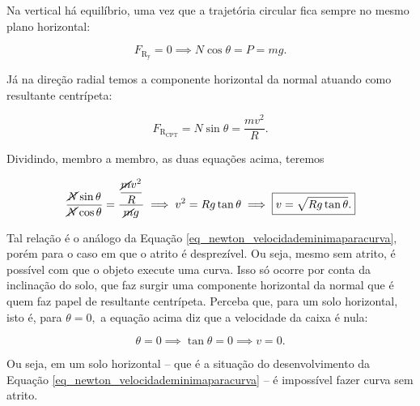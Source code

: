 \begin{exemplo}[Nível II]
Na vertical há equilíbrio, uma vez que a trajetória circular fica sempre no mesmo plano horizontal:

$$ F_{\text{R}_{\text{y}}} = 0 \implies N \cos \theta = P=mg.$$

Já na direção radial temos a componente horizontal da normal atuando como resultante centrípeta:

$$ F_{\text{R}_{\text{CPT}}} = N \sin \theta = \dfrac{mv^2}{R}.$$

Dividindo, membro a membro, as duas equações acima, teremos

$$ \dfrac{\cancel N \sin \theta}{\cancel N \cos \theta} = \dfrac{\dfrac{\cancel mv^2}{R}}{\cancel mg} \implies v^2 = Rg \tan \theta \implies \boxed{v=\sqrt{Rg \tan \theta}.}$$

Tal relação é o análogo da Equação \eqref{eq_newton_velocidademinimaparacurva}, porém para o caso em que o atrito é desprezível. Ou seja, mesmo sem atrito, é possível com que o objeto execute uma curva. Isso só ocorre por conta da inclinação do solo, que faz surgir uma componente horizontal da normal que é quem faz papel de resultante centrípeta. Perceba que, para um solo horizontal, isto é, para $\theta = 0,$ a equação acima diz que a velocidade da caixa é nula:

$$ \theta = 0 \implies \tan \theta = 0 \implies \boxed{v =0.}$$

Ou seja, em um solo horizontal -- que é a situação do desenvolvimento da Equação \eqref{eq_newton_velocidademinimaparacurva} -- é impossível fazer curva sem atrito.



\end{exemplo}


\vspace{0.3cm}


